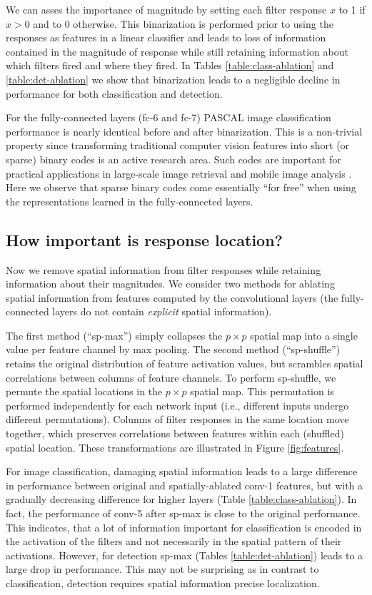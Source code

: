 We can asses the importance of magnitude by setting each filter response $x$ to 1 if $x > 0$ and to $0$ otherwise. This binarization is performed prior to using the responses as features in a linear classifier and leads to loss of information contained in the magnitude of response while still retaining information about which filters fired and where they fired. 
In Tables \ref{table:class-ablation} and \ref{table:det-ablation} we show that binarization leads to a negligible decline in performance for both classification and detection. 

For the fully-connected layers (fc-6 and fc-7) PASCAL image classification performance is nearly identical before and after binarization.
This is a non-trivial property since transforming traditional computer vision features into short (or sparse) binary codes is an active research area. Such codes are important for practical applications in large-scale image retrieval and mobile image analysis . Here we observe that sparse binary codes come essentially ``for free'' when using the representations learned in the fully-connected layers.

\subsection{How important is response location?}
\label{sub:imp-loc}
Now we remove spatial information from filter responses while retaining information about their magnitudes. We consider two methods for ablating spatial information from features computed by the convolutional layers (the fully-connected layers do not contain \emph{explicit} spatial information).

The first method (``sp-max'') simply collapses the $p \times p$ spatial map into a single value per feature channel by max pooling. The second method (``sp-shuffle'') retains the original distribution of feature activation values, but scrambles spatial correlations between columns of feature channels. To perform sp-shuffle, we permute the spatial locations in the $p \times p$ spatial map. This permutation is performed independently for each network input (i.e., different inputs undergo different permutations). Columns of filter responses in the same location move together, which preserves correlations between features within each (shuffled) spatial location. These transformations are illustrated in Figure \ref{fig:features}.

For image classification, damaging spatial information leads to a large difference in performance between original and spatially-ablated conv-1 features, but with a gradually decreasing difference for higher layers (Table \ref{table:class-ablation}). 
In fact, the performance of conv-5 after sp-max is close to the original performance. 
This indicates, that a lot of information important for classification is encoded in the activation of the filters and not necessarily in the spatial pattern of their activations. 
However, for detection sp-max (Tables \ref{table:det-ablation}) leads to a large drop in performance. 
This may not be surprising as in contrast to classification, detection requires spatial information precise localization.

